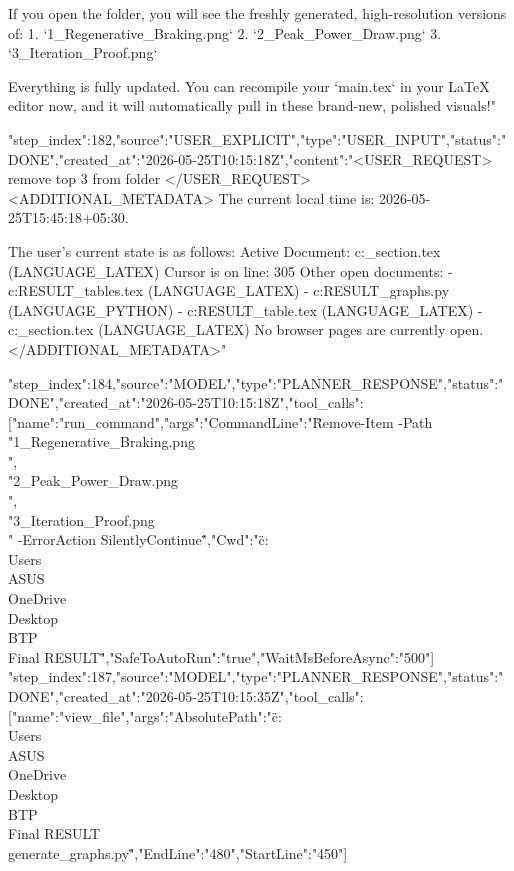 \begin{table}[t]
{\begin{table}[t]
{{{{{{{{{{{{{{{If you open the folder, you will see the freshly generated, high-resolution versions of:
1. `1_Regenerative_Braking.png`
2. `2_Peak_Power_Draw.png`
3. `3_Iteration_Proof.png`

Everything is fully updated. You can recompile your `main.tex` in your LaTeX editor now, and it will automatically pull in these brand-new, polished visuals!"}
{"step_index":182,"source":"USER_EXPLICIT","type":"USER_INPUT","status":"DONE","created_at":"2026-05-25T10:15:18Z","content":"<USER_REQUEST>
remove top  3 from folder 
</USER_REQUEST>
<ADDITIONAL_METADATA>
The current local time is: 2026-05-25T15:45:18+05:30.

The user's current state is as follows:
Active Document: c:\Users\ASUS\OneDrive\Desktop\BTP\results_section.tex (LANGUAGE_LATEX)
Cursor is on line: 305
Other open documents:
- c:\Users\ASUS\OneDrive\Desktop\BTP\Final RESULT\additional_tables.tex (LANGUAGE_LATEX)
- c:\Users\ASUS\OneDrive\Desktop\BTP\Final RESULT\generate_graphs.py (LANGUAGE_PYTHON)
- c:\Users\ASUS\OneDrive\Desktop\BTP\Final RESULT\comparison_table.tex (LANGUAGE_LATEX)
- c:\Users\ASUS\OneDrive\Desktop\BTP\results_section.tex (LANGUAGE_LATEX)
No browser pages are currently open.
</ADDITIONAL_METADATA>"}
{"step_index":184,"source":"MODEL","type":"PLANNER_RESPONSE","status":"DONE","created_at":"2026-05-25T10:15:18Z","tool_calls":[{"name":"run_command","args":{"CommandLine":"\"Remove-Item -Path \\"1_Regenerative_Braking.png\\", \\"2_Peak_Power_Draw.png\\", \\"3_Iteration_Proof.png\\" -ErrorAction SilentlyContinue\"","Cwd":"\"c:\\Users\\ASUS\\OneDrive\\Desktop\\BTP\\Final RESULT\"","SafeToAutoRun":"true","WaitMsBeforeAsync":"500"}}]}
{"step_index":187,"source":"MODEL","type":"PLANNER_RESPONSE","status":"DONE","created_at":"2026-05-25T10:15:35Z","tool_calls":[{"name":"view_file","args":{"AbsolutePath":"\"c:\\Users\\ASUS\\OneDrive\\Desktop\\BTP\\Final RESULT\\generate_graphs.py\"","EndLine":"480","StartLine":"450"}}]}
}}}}}}}}}}}}}}
\end{table}}
\end{table}
